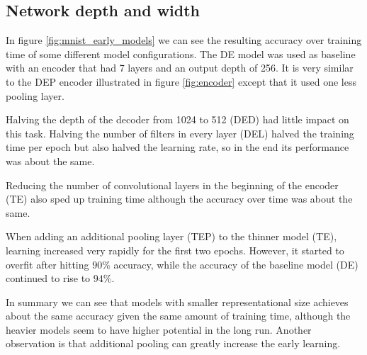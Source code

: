 




\subsection{Network depth and width} \label{sssec:exp_encoder}

In figure \ref{fig:mnist_early_models} we can see the resulting accuracy over training time of some different model configurations. The DE model was used as baseline with an encoder that had 7 layers and an output depth of 256. It is very similar to the DEP encoder illustrated in figure \ref{fig:encoder} except that it used one less pooling layer.

Halving the depth of the decoder from 1024 to 512 (DED) had little impact on this task. Halving the number of filters in every layer (DEL) halved the training time per epoch but also halved the learning rate, so in the end its performance was about the same.


Reducing the number of convolutional layers in the beginning of the encoder (TE) also sped up training time although the accuracy over time was about the same.

When adding an additional pooling layer (TEP) to the thinner model (TE), learning increased very rapidly for the first two epochs. However, it started to overfit after hitting $90\%$ accuracy, while the accuracy of the baseline model (DE) continued to rise to $94\%$.

In summary we can see that models with smaller representational size achieves about the same accuracy given the same amount of training time, although the heavier models seem to have higher potential in the long run. Another observation is that additional pooling can greatly increase the early learning.



